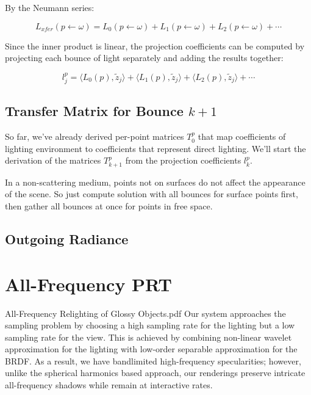 By the Neumann series:

\begin{equation*}
	L_{xfer}(p\leftarrow\omega)=L_{0}(p\leftarrow\omega)+L_{1}(p\leftarrow\omega)+L_{2}(p\leftarrow\omega)+\cdots
\end{equation*}

Since the inner product is linear, the projection coefficients can be computed by projecting each bounce of light separately and adding the results together:

\begin{equation*}
	l^{p}_j=\langle L_0(p),\tilde{z}_j\rangle+\langle L_1(p),\tilde{z}_j\rangle+\langle L_2(p),\tilde{z}_j\rangle+\cdots
\end{equation*}




\subsection{Transfer Matrix for Bounce $k+1$}
So far, we've already derived per-point matrices $T^{p}_0$ that map coefficients of lighting environment to coefficients that represent direct lighting. We'll start the derivation of the matrices $T^{p}_{k+1}$ from the projection coefficients $l^{p}_k$.




In a non-scattering medium, points not on surfaces do not affect the appearance of the scene. So just compute solution with all bounces for surface points first, then gather all bounces at once for points in free space.


\subsection{Outgoing Radiance}



\section{All-Frequency PRT}

All-Frequency Relighting of Glossy Objects.pdf
Our system approaches the sampling problem by choosing a high sampling rate for the lighting but a low sampling rate for the view. This is achieved by combining non-linear wavelet approximation for the lighting with low-order separable approximation for the BRDF. As a result, we have bandlimited high-frequency specularities; however, unlike the spherical harmonics based approach, our renderings preserve intricate all-frequency shadows while remain at interactive rates.



